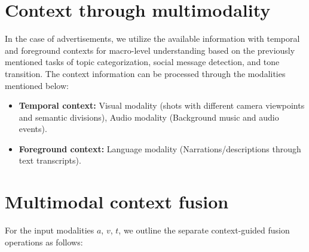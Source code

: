 \section{Context through multimodality}
In the case of advertisements, we utilize the available information with temporal and foreground contexts for macro-level understanding based on the previously mentioned tasks of topic categorization, social message detection, and tone transition. The context information can be processed through the modalities mentioned below:
\begin{itemize}
    \item \textbf{Temporal context:} Visual modality (shots with different camera viewpoints and semantic divisions), Audio modality 
      (Background music and audio events).
    \item \textbf{Foreground context:} Language modality (Narrations/descriptions through text transcripts).
\end{itemize}
\section{Multimodal context fusion}
For the input modalities $a$, $v$, $t$, we outline the separate context-guided fusion operations as follows:
